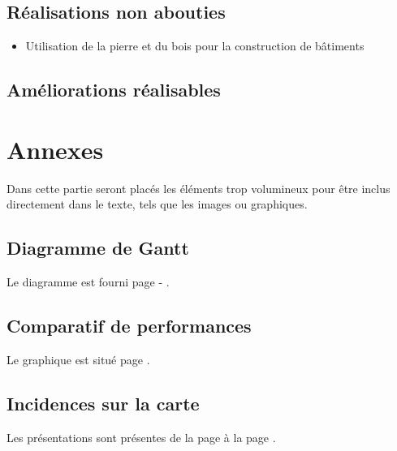 \documentclass[a4paper]{memoir}
\begin{document}
		\section{Réalisations non abouties}
			\begin{itemize}[label=$\bullet$]
				\item Utilisation de la pierre et du bois pour la construction de bâtiments
			\end{itemize}
			
		\section{Améliorations réalisables}
		
		
	\chapter{Annexes}
		Dans cette partie seront placés les éléments trop volumineux pour être inclus directement dans le texte, tels que les images ou graphiques.\\
		
		\section{Diagramme de Gantt}
			Le diagramme est fourni page \pageref{fig:gantt1} - \pageref{fig:gantt2}.
			
		\section{Comparatif de performances}
			Le graphique est situé page \pageref{fig:analyse}.
			
		\section{Incidences sur la carte}
			Les présentations sont présentes de la page \pageref{fig:incidenceDeb} à la page \pageref{fig:incidenceFin}.
			
\end{document}
